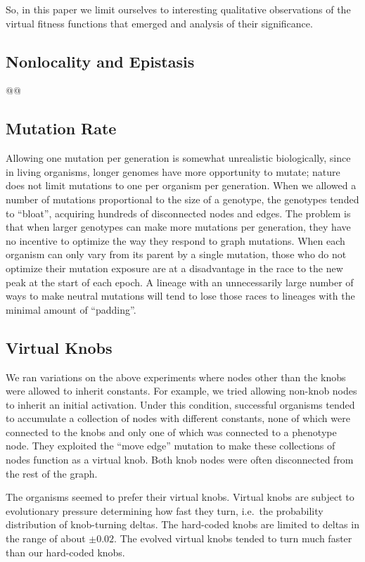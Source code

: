 \documentclass[letterpaper]{article}
\begin{document}
So, in this paper we limit ourselves to interesting qualitative observations
of the virtual fitness functions that emerged and analysis of their
significance.

\subsection{Nonlocality and Epistasis}

@@

\subsection{Mutation Rate}

Allowing one mutation per generation is somewhat unrealistic biologically,
since in living organisms, longer genomes have more opportunity to mutate;
nature does not limit mutations to one per organism per generation. When we
allowed a number of mutations proportional to the size of a genotype, the
genotypes tended to ``bloat'', acquiring hundreds of disconnected nodes and
edges. The problem is that when larger genotypes can make more mutations per
generation, they have no incentive to optimize the way they respond to graph
mutations.  When each organism can only vary from its parent by a single
mutation, those who do not optimize their mutation exposure are at a
disadvantage in the race to the new peak at the start of each epoch. A lineage
with an unnecessarily large number of ways to make neutral mutations will tend
to lose those races to lineages with the minimal amount of ``padding''.

\subsection{Virtual Knobs}

We ran variations on the above experiments where nodes other than the knobs were
allowed to inherit constants. For example, we tried allowing non-knob nodes to
inherit an initial activation. Under this condition, successful organisms tended
to accumulate a collection of nodes with different constants, none of which were
connected to the knobs and only one of which was connected to a phenotype node.
They exploited the ``move edge'' mutation to make these collections of nodes
function as a virtual knob. Both knob nodes were often disconnected from the
rest of the graph.

The organisms seemed to prefer their virtual knobs. Virtual knobs are subject to
evolutionary pressure determining how fast they turn, i.e.~the probability
distribution of knob-turning deltas. The hard-coded knobs are limited to deltas
in the range of about $\pm0.02$. The evolved virtual knobs tended to turn much
faster than our hard-coded knobs.
\end{document}
